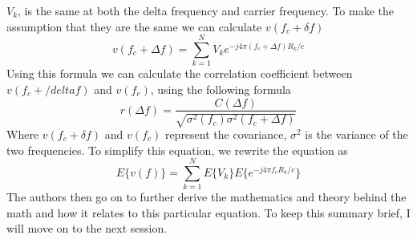 \documentclass[12pt]{article}
\begin{document}
$V_k$, is the same at both the delta frequency and carrier frequency. To make the assumption that they are the same we can calculate $v(f_c + \delta f)$
\begin{equation}
    v(f_c + \Delta f) = \sum_{k=1}^{N} V_k e^{-j4\pi (f_c + \Delta f) R_k / c}
\end{equation}
Using this formula we can calculate the correlation coefficient between $v(f_c + /delta f)$ and $v(f_c)$, using the following formula
\begin{equation}
   r(\Delta f) = \frac{ C(\Delta f) }{ \sqrt{\sigma^2 (f_c) \sigma^2 (f_c + \Delta f)}}
\end{equation} 
Where $v(f_c + \delta f)$ and $v(f_c)$ represent the covariance, $\sigma^2$ is the variance of the two frequencies. To simplify this equation, we rewrite the equation as 
\begin{equation}
   E\{ v(f) \} = \sum_{k=1}^{N} E \{ V_k\} E \{ e^{-j 4 \pi f_c R_k / c} \}
\end{equation}
The authors then go on to further derive the mathematics and theory behind the math and how it relates to this particular equation. To keep this summary brief, I will move on to the next session.

\end{document}
